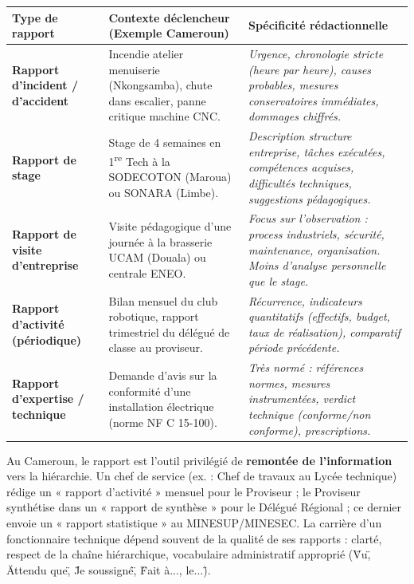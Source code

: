\documentclass[11pt]{article}
\newcommand{\cle}[1]{{\popxbold\color{popdark}#1}}
\begin{document}
\begin{center}
\begin{tabularx}{\linewidth}{|l|X|X|}\hline
\rowcolor{popblue}\textbf{Type de rapport} & \textbf{Contexte déclencheur (Exemple Cameroun)} & \textbf{Spécificité rédactionnelle} \\\hline
\textbf{Rapport d'incident / d'accident} & Incendie atelier menuiserie (Nkongsamba), chute dans escalier, panne critique machine CNC. & \emph{Urgence, chronologie stricte (heure par heure), causes probables, mesures conservatoires immédiates, dommages chiffrés.} \\\hline
\textbf{Rapport de stage} & Stage de 4 semaines en 1\textsuperscript{re} Tech à la SODECOTON (Maroua) ou SONARA (Limbe). & \emph{Description structure entreprise, tâches exécutées, compétences acquises, difficultés techniques, suggestions pédagogiques.} \\\hline
\textbf{Rapport de visite d'entreprise} & Visite pédagogique d'une journée à la brasserie UCAM (Douala) ou centrale ENEO. & \emph{Focus sur l'observation : process industriels, sécurité, maintenance, organisation. Moins d'analyse personnelle que le stage.} \\\hline
\textbf{Rapport d'activité (périodique)} & Bilan mensuel du club robotique, rapport trimestriel du délégué de classe au proviseur. & \emph{Récurrence, indicateurs quantitatifs (effectifs, budget, taux de réalisation), comparatif période précédente.} \\\hline
\textbf{Rapport d'expertise / technique} & Demande d'avis sur la conformité d'une installation électrique (norme NF C 15-100). & \emph{Très normé : références normes, mesures instrumentées, verdict technique (conforme/non conforme), prescriptions.} \\\hline
\end{tabularx}
\end{center}

\begin{savaistu}
Au Cameroun, le \cle{rapport} est l'outil privilégié de \textbf{remontée de l'information} vers la hiérarchie. Un chef de service (ex. : Chef de travaux au Lycée technique) rédige un « rapport d'activité » mensuel pour le Proviseur ; le Proviseur synthétise dans un « rapport de synthèse » pour le Délégué Régional ; ce dernier envoie un « rapport statistique » au MINESUP/MINESEC. La carrière d'un fonctionnaire technique dépend souvent de la qualité de ses rapports : clarté, respect de la chaîne hiérarchique, vocabulaire administratif approprié (\"Vu\", \"Attendu que\", \"Je soussigné\", \"Fait à..., le...\").
\end{savaistu}
\end{document}
